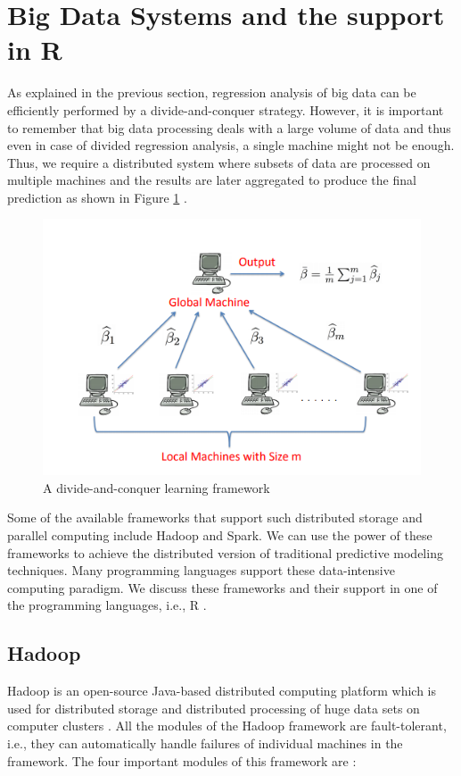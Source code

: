 \documentclass[sigconf]{acmart}
\begin{document}
\section{Big Data Systems and the support in R}
As explained in the previous section, regression analysis of big data can be efficiently performed by a divide-and-conquer strategy. However, it is important to remember that big data processing deals with a large volume of data and thus even in case of divided regression analysis, a single machine might not be enough. Thus, we require a distributed system where subsets of data are processed on multiple machines and the results are later aggregated to produce the final prediction as shown in Figure \ref{fig:Fig3} \cite{dkr-reg}.
\begin{figure}[!ht]
  \centering\includegraphics[width=\columnwidth]{images/Fig3.png}
  \caption{A divide-and-conquer learning framework \cite{dkr-reg}}
  \label{fig:Fig3}
\end{figure}
Some of the available frameworks that support such distributed storage and parallel computing include Hadoop and Spark. We can use the power of these frameworks to achieve the distributed version of traditional predictive modeling techniques. Many programming languages support these data-intensive computing paradigm. We discuss these frameworks and their support in one of the programming languages, i.e., R \cite{log-reg}.

\subsection{Hadoop} 
Hadoop is an open-source Java-based distributed computing platform which is used for distributed storage and distributed processing of huge data sets on computer clusters \cite{log-reg}. All the modules of the Hadoop framework are fault-tolerant, i.e., they can automatically handle failures of individual machines in the framework. The four important modules of this framework are \cite{log-reg}:
\end{document}
